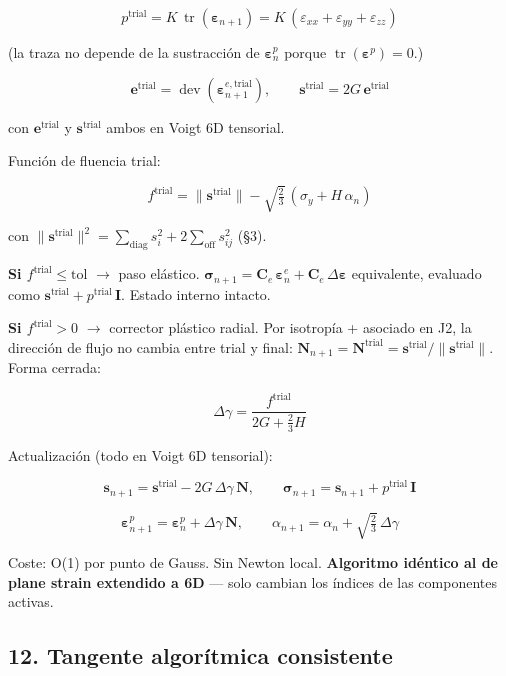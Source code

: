\documentclass[11pt,letterpaper,oneside]{report}
\begin{document}
\[
p^\text{trial} = K\,\operatorname{tr}(\boldsymbol\varepsilon_{n+1}) = K\,(\varepsilon_{xx} + \varepsilon_{yy} + \varepsilon_{zz})
\]

(la traza no depende de la sustracción de $\boldsymbol\varepsilon^p_n$ porque $\operatorname{tr}(\boldsymbol\varepsilon^p) = 0$.)

\[
\mathbf e^\text{trial} = \operatorname{dev}(\boldsymbol\varepsilon^{e,\text{trial}}_{n+1}), \qquad \mathbf s^\text{trial} = 2G\,\mathbf e^\text{trial}
\]

con $\mathbf e^\text{trial}$ y $\mathbf s^\text{trial}$ ambos en Voigt 6D tensorial.

Función de fluencia trial:

\[
f^\text{trial} = \|\mathbf s^\text{trial}\| - \sqrt{\tfrac{2}{3}}\,(\sigma_y + H\,\alpha_n)
\]

con $\|\mathbf s^\text{trial}\|^2 = \sum_\text{diag} s_i^2 + 2\sum_\text{off} s_{ij}^2$ (§3).

\textbf{Si $f^\text{trial} \leq \text{tol}$} \ensuremath{\to} paso elástico. $\boldsymbol\sigma_{n+1} = \mathbf C_e\,\boldsymbol\varepsilon^e_n + \mathbf C_e\,\Delta\boldsymbol\varepsilon$ equivalente, evaluado como $\mathbf s^\text{trial} + p^\text{trial}\,\mathbf I$. Estado interno intacto.

\textbf{Si $f^\text{trial} > 0$} \ensuremath{\to} corrector plástico radial. Por isotropía + asociado en J2, la dirección de flujo no cambia entre trial y final: $\mathbf N_{n+1} = \mathbf N^\text{trial} = \mathbf s^\text{trial}/\|\mathbf s^\text{trial}\|$. Forma cerrada:

\[
\boxed{\Delta\gamma = \frac{f^\text{trial}}{2G + \tfrac{2}{3}H}}
\]

Actualización (todo en Voigt 6D tensorial):

\[
\mathbf s_{n+1} = \mathbf s^\text{trial} - 2G\,\Delta\gamma\,\mathbf N, \qquad \boldsymbol\sigma_{n+1} = \mathbf s_{n+1} + p^\text{trial}\,\mathbf I
\]

\[
\boldsymbol\varepsilon^p_{n+1} = \boldsymbol\varepsilon^p_n + \Delta\gamma\,\mathbf N, \qquad \alpha_{n+1} = \alpha_n + \sqrt{\tfrac{2}{3}}\,\Delta\gamma
\]

Coste: O(1) por punto de Gauss. Sin Newton local. \textbf{Algoritmo idéntico al de plane strain extendido a 6D} --- solo cambian los índices de las componentes activas.

\subsection{12. Tangente algorítmica consistente}
\end{document}
